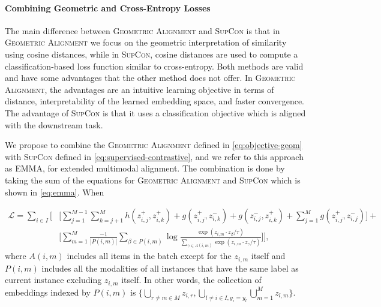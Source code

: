 \documentclass[10pt]{article} %
\newcommand{\ours}{\textsc{EMMA}}
\newcommand{\geom}{\textsc{Geometric Alignment}}
\newcommand{\supcon}{\textsc{SupCon}}
\begin{document}
\paragraph{Combining Geometric and Cross-Entropy Losses}
\label{subsec:emma}

The main difference between \geom{} and \supcon{} is that in \geom{} we focus on the geometric interpretation of similarity using cosine distances, while in \supcon{}, cosine distances are used to compute a classification-based loss function similar to cross-entropy.
Both methods are valid and have some advantages that the other method does not offer. In \geom{}, the advantages are an intuitive learning objective in terms of distance, interpretability of the learned embedding space, and faster convergence. 
The advantage of \supcon{} is that it uses a classification objective which is aligned with the downstream task.

We propose to combine the \geom{} defined in \cref{eq:objective-geom} with \supcon{} defined in \cref{eq:supervised-contrastive}, and we refer to this approach as \ours{}, for extended multimodal alignment. The combination is done by taking the sum of the equations for \geom{} and \supcon{} which is shown in \cref{eq:emma}.
When


\begin{equation}\label{eq:emma}
\begin{split}
    \mathcal{L} =  \sum_{i \in I} \Biggr[ & \Bigr[ \sum_{j=1}^{M-1} \sum_{k=j+1}^{M} h( z_{i,j}^{+} , z_{i,k}^{+})
     + g( z_{i,j}^{+} , z_{i,k}^{-}) + g( z_{i,j}^{-} , z_{i,k}^{+}) + \sum_{j=1}^{M} g( z_{i,j}^{+} , z_{i,j}^{-} )\Bigr] + \\
     & \Bigr[ \sum_{m=1}^{M} \frac{-1}{|P(i,m)|}  \sum_{\beta \in P(i,m)} \log \frac{\exp (z_{i,m} \cdot z_{\beta} / \tau) }{\sum_{\gamma \in A(i,m)} \exp (z_{i,m} \cdot z_{\gamma} / \tau)} \Bigr] \Biggr], 
     \end{split}
\end{equation}
where $A(i,m)$ includes all items in the batch except for the $z_{i,m}$ itself and $P(i,m)$ includes all the modalities of all instances that have the same label as current instance excluding $z_{i,m}$ itself. 
In other words, the collection of embeddings indexed by $P(i,m)$ is $\{ \bigcup\limits_{r \neq m \in M} z_{i,r}, \bigcup\limits_{l \neq i \in I , y_i = y_l} \bigcup\limits_{m=1}^{M} z_{l,m} \} $.

\end{document}
